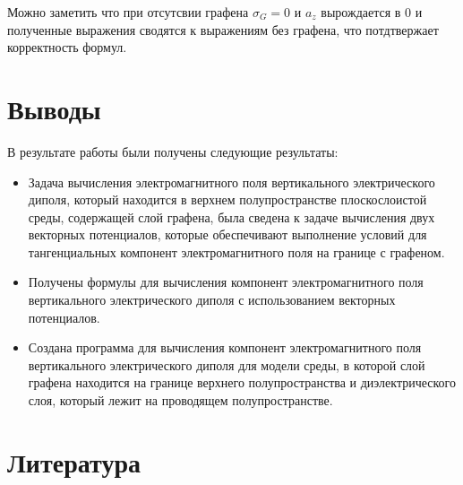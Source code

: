 	Можно заметить что при отсутсвии графена $\sigma_G = 0$ и $a_z$ вырождается в 0 и полученные выражения сводятся к выражениям без графена, что потдтвержает корректность формул.
	
	\newpage
	
	
	
	
	\section{Выводы}
	
	В результате работы были получены следующие результаты:
	\begin{itemize}
		\item Задача вычисления электромагнитного поля вертикального электрического диполя, который находится в верхнем полупространстве плоскослоистой среды, содержащей слой графена, была сведена к задаче вычисления двух векторных потенциалов, которые обеспечивают выполнение условий для тангенциальных компонент электромагнитного поля на границе с графеном.
		\item	Получены формулы для вычисления компонент электромагнитного поля вертикального электрического диполя с использованием векторных потенциалов.
		\item 	Создана программа для вычисления компонент электромагнитного поля вертикального электрического диполя для модели среды, в которой слой графена находится на границе верхнего полупространства и диэлектрического слоя, который лежит на проводящем полупространстве. 
		
	\end{itemize}
	
	\newpage 
	
	\section{Литература}
	
